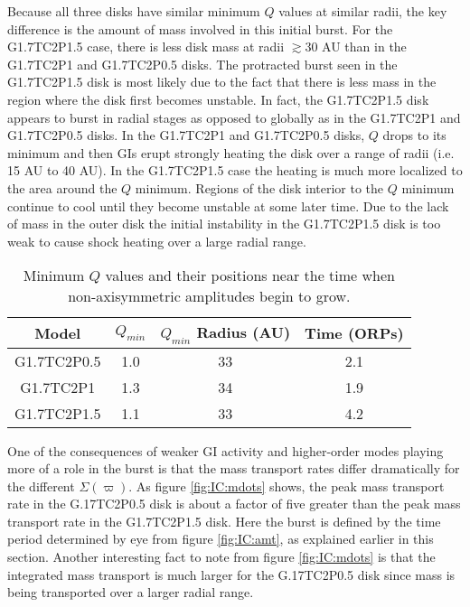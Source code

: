 Because all three disks have similar minimum $Q$ values at similar radii, the key difference is the amount of mass involved in this initial burst. For the G1.7TC2P1.5 case, there is less disk mass at radii $\gtrsim 30$ AU than in the G1.7TC2P1 and G1.7TC2P0.5 disks. The protracted burst seen in the G1.7TC2P1.5 disk is most likely due to the fact that there is less mass in the region where the disk first becomes unstable. In fact, the G1.7TC2P1.5 disk appears to burst in radial stages as opposed to globally as in the G1.7TC2P1 and G1.7TC2P0.5 disks. In the G1.7TC2P1 and G1.7TC2P0.5 disks, $Q$ drops to its minimum and then GIs erupt strongly heating the disk over a range of radii (i.e. 15 AU to 40 AU). In the G1.7TC2P1.5 case the heating is much more localized to the area around the $Q$ minimum. Regions of the disk interior to the $Q$ minimum continue to cool until they become unstable at some later time. Due to the lack of mass in the outer disk the initial instability in the G1.7TC2P1.5 disk is too weak to cause shock heating over a large radial range.  
\begin{table}
\renewcommand{\arraystretch}{1.25}
\begin{tabular*}{1.0\textwidth}{@{\extracolsep{\fill}}cccc}
\hline
Model&$Q_{min}$&$Q_{min}$ Radius (AU)&Time (ORPs)\\
\hline\hline  
G1.7TC2P0.5&1.0&33&2.1\\ 
G1.7TC2P1&1.3&34&1.9\\ 
G1.7TC2P1.5&1.1&33&4.2\\ 
\hline
\end{tabular*}
\vspace{0.1in}
\caption[Minimum $Q$ values for different initial surface density profiles]{Minimum $Q$ values and their positions near the time when non-axisymmetric amplitudes begin to grow.}
\label{tbl:IC:qmins}
\end{table} 
\renewcommand{\arraystretch}{1}

One of the consequences of weaker GI activity and higher-order modes playing more of a role in the burst is that the mass transport rates differ dramatically for the different $\Sigma(\varpi)$. As figure \ref{fig:IC:mdots} shows, the peak mass transport rate in the G.17TC2P0.5 disk is about a factor of five greater than the peak mass transport rate in the G1.7TC2P1.5 disk. Here the burst is defined by the time period determined by eye from figure \ref{fig:IC:amt}, as explained earlier in this section. Another interesting fact to note from figure \ref{fig:IC:mdots} is that the integrated mass transport is much larger for the G.17TC2P0.5 disk since mass is being transported over a larger radial range. 

